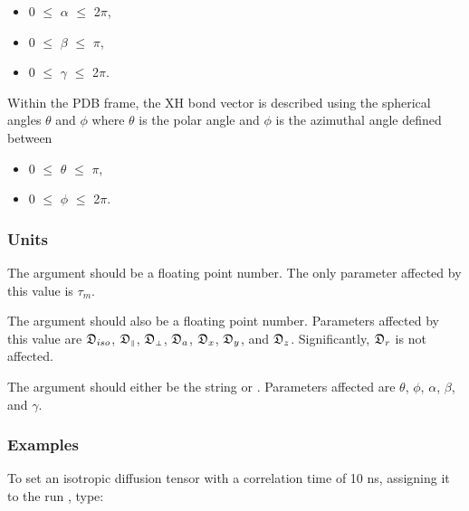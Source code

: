\begin{itemize}
\item[] 0 $\le$ $\alpha$ $\le$ 2$\pi$, 
\item[] 0 $\le$ $\beta$ $\le$ $\pi$, 
\item[] 0 $\le$ $\gamma$ $\le$ 2$\pi$. 
\end{itemize}


Within the PDB frame, the XH bond vector is described using the spherical angles $\theta$ and $\phi$ where $\theta$ is the polar angle and $\phi$ is the azimuthal angle defined between


\begin{itemize}
\item[] 0 $\le$ $\theta$ $\le$ $\pi$, 
\item[] 0 $\le$ $\phi$ $\le$ 2$\pi$. 
\end{itemize}



\subsubsection{Units}

The  argument should be a floating point number.  The only parameter affected by this value is $\tau_m$.


The  argument should also be a floating point number.  Parameters affected by this value are $\mathfrak{D}_{iso}$, $\mathfrak{D}_{\scriptscriptstyle \parallel}$, $\mathfrak{D}_{\scriptscriptstyle \perp}$, $\mathfrak{D}_a$, $\mathfrak{D}_x$, $\mathfrak{D}_y$, and $\mathfrak{D}_z$.  Significantly, $\mathfrak{D}_r$ is not affected.


The  argument should either be the string  or .  Parameters affected are $\theta$, $\phi$, $\alpha$, $\beta$, and $\gamma$.



\subsubsection{Examples}

To set an isotropic diffusion tensor with a correlation time of 10 ns, assigning it to the run , type:




